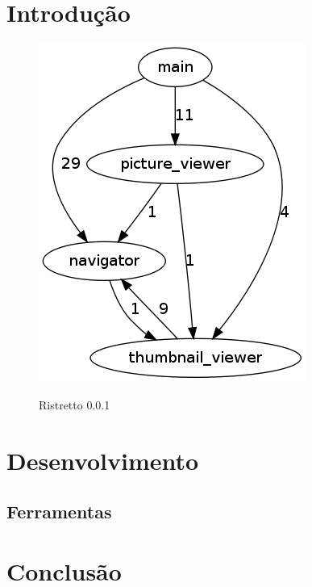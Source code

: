 \chapter{Introdução}

\begin{figure}[h]
\centering
\includegraphics[scale=1]{imagens/ristretto-0.0.1-doxyparse.png}
\label{ristretto-0.0.1-doxyparse}
\caption{Ristretto 0.0.1}
\end{figure}

\chapter{Desenvolvimento}

\section{Ferramentas}

\chapter{Conclusão}

